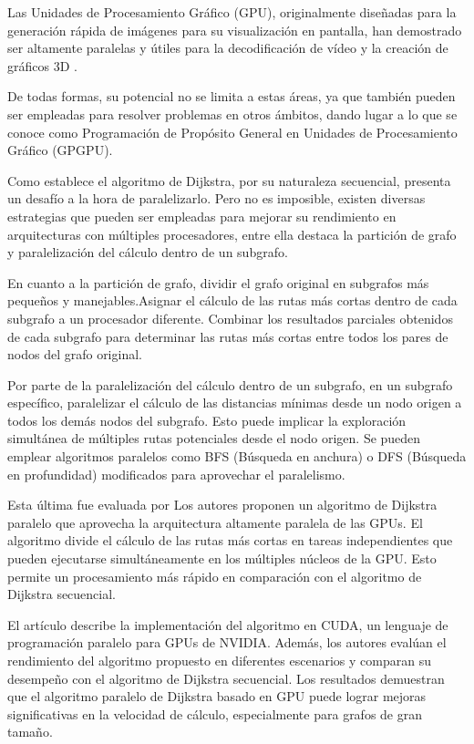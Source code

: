 Las Unidades de Procesamiento Gráfico (GPU), originalmente diseñadas para la generación rápida de imágenes para su visualización en pantalla, han demostrado ser altamente paralelas y útiles para la decodificación de vídeo y la creación de gráficos 3D \cite{Randima}.

De todas formas, su potencial no se limita a estas áreas, ya que también pueden ser empleadas para resolver problemas en otros ámbitos, dando lugar a lo que se conoce como Programación de Propósito General en Unidades de Procesamiento Gráfico (GPGPU).

Como establece \cite{Cormen} el algoritmo de Dijkstra, por su naturaleza secuencial, presenta un desafío a la hora de paralelizarlo. Pero no es imposible, existen diversas estrategias que pueden ser empleadas para mejorar su rendimiento en arquitecturas con múltiples procesadores, entre ella destaca la partición de grafo y paralelización del cálculo dentro de un subgrafo. 

En cuanto a la partición de grafo, dividir el grafo original en subgrafos más pequeños y manejables.Asignar el cálculo de las rutas más cortas dentro de cada subgrafo a un procesador diferente. Combinar los resultados parciales obtenidos de cada subgrafo para determinar las rutas más cortas entre todos los pares de nodos del grafo original.

Por parte de la paralelización del cálculo dentro de un subgrafo, en un subgrafo específico, paralelizar el cálculo de las distancias mínimas desde un nodo origen a todos los demás nodos del subgrafo. Esto puede implicar la exploración simultánea de múltiples rutas potenciales desde el nodo origen. Se pueden emplear algoritmos paralelos como BFS (Búsqueda en anchura) o DFS (Búsqueda en profundidad) modificados para aprovechar el paralelismo.

Esta última fue evaluada por \cite{Luo} Los autores proponen un algoritmo de Dijkstra paralelo que aprovecha la arquitectura altamente paralela de las GPUs. El algoritmo divide el cálculo de las rutas más cortas en tareas independientes que pueden ejecutarse simultáneamente en los múltiples núcleos de la GPU. Esto permite un procesamiento más rápido en comparación con el algoritmo de Dijkstra secuencial.

El artículo describe la implementación del algoritmo en CUDA, un lenguaje de programación paralelo para GPUs de NVIDIA. Además, los autores evalúan el rendimiento del algoritmo propuesto en diferentes escenarios y comparan su desempeño con el algoritmo de Dijkstra secuencial. Los resultados demuestran que el algoritmo paralelo de Dijkstra basado en GPU puede lograr mejoras significativas en la velocidad de cálculo, especialmente para grafos de gran tamaño.

